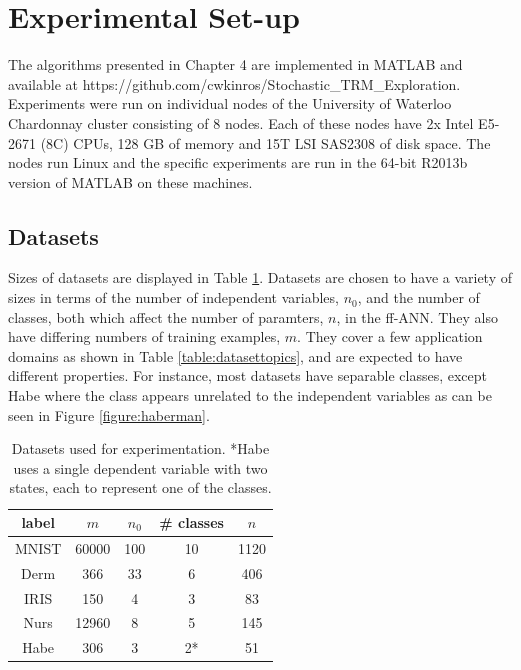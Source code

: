 \documentclass[letterpaper,12pt,titlepage,oneside,final]{book}
\begin{document}
	
	\section{Experimental Set-up}
	
	The algorithms presented in Chapter 4 are implemented in MATLAB and available at  https://github.com/cwkinros/Stochastic\_TRM\_Exploration. Experiments were run on individual nodes of the University of Waterloo Chardonnay cluster consisting of 8 nodes. Each of these nodes have 2x Intel E5-2671 (8C) CPUs, 128 GB of memory and 15T LSI SAS2308 of disk space. The nodes run Linux and the specific experiments are run in the 64-bit R2013b version of MATLAB on these machines.
	
	\subsection{Datasets}
	
	Sizes of datasets are displayed in Table \ref{table:datasets}. Datasets are chosen to have a variety of sizes in terms of the number of independent variables, $n_{0}$, and the number of classes, both which affect the number of paramters, $n$, in the ff-ANN. They also have differing numbers of training examples, $m$. They cover a few application domains as shown in Table \ref{table:datasettopics}, and are expected to have different properties. For instance, most datasets have separable classes, except Habe where the class appears unrelated to the independent variables as can be seen in Figure \ref{figure:haberman}.
	
	\begin{table}[h]
		\begin{center}
			\begin{tabular}{ |c|c|c|c|c| }  
				\hline
				\textbf{label} & \textbf{$m$} & \textbf{$n_{0}$} & \textbf{\# classes} & $n$  \\
				\hline
				MNIST & 60000 & 100 & 10 & 1120 \\
				Derm & 366 & 33 & 6 & 406 \\
				IRIS & 150 & 4 & 3 & 83\\
				Nurs & 12960 & 8 & 5 & 145 \\
				Habe & 306 & 3 & 2* & 51 \\ 
				\hline
			\end{tabular}
			\caption{Datasets used for experimentation. *Habe uses a single dependent variable with two states, each to represent one of the classes.}
			\label{table:datasets}
		\end{center}
	\end{table}
	
\end{document}
